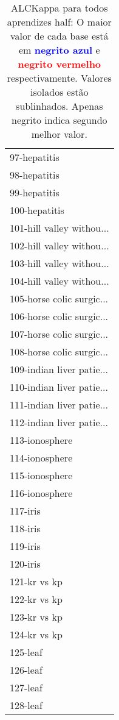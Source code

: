 \begin{table}[h]
\caption{ALCKappa para todos aprendizes half: O maior valor de cada base está em \textcolor{blue}{\textbf{negrito azul}} e \textcolor{red}{\textbf{negrito vermelho}} respectivamente. Valores isolados estão sublinhados. Apenas negrito indica segundo melhor valor.}
\begin{center}\begin{tabular}{l}
 & \\ \hline 97-hepatitis &  \\
98-hepatitis &  \\
99-hepatitis &  \\
100-hepatitis &  \\
101-hill valley withou... &  \\
102-hill valley withou... &  \\
103-hill valley withou... &  \\ \hline
104-hill valley withou... &  \\
105-horse colic surgic... &  \\
106-horse colic surgic... &  \\
107-horse colic surgic... &  \\
108-horse colic surgic... &  \\
109-indian liver patie... &  \\
110-indian liver patie... &  \\ \hline
111-indian liver patie... &  \\
112-indian liver patie... &  \\
113-ionosphere &  \\
114-ionosphere &  \\
115-ionosphere &  \\
116-ionosphere &  \\
117-iris &  \\ \hline
118-iris &  \\
119-iris &  \\
120-iris &  \\
121-kr vs kp &  \\
122-kr vs kp &  \\
123-kr vs kp &  \\
124-kr vs kp &  \\ \hline
125-leaf &  \\
126-leaf &  \\
127-leaf &  \\
128-leaf &  \\\end{tabular}\label{stratsALCKappa3Allallb}
\end{center}
\end{table}
